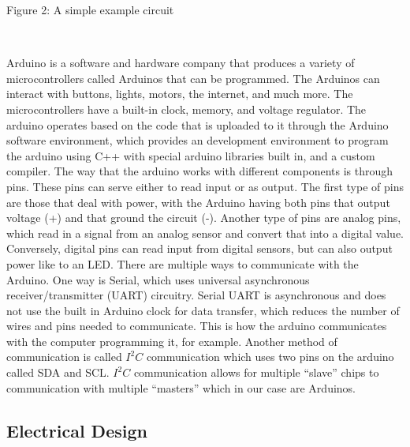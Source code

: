 \documentclass[12pt,]{article}
\begin{document}
Figure 2: A simple example circuit

~

Arduino is a software and hardware company that produces a variety of
microcontrollers called Arduinos that can be programmed. The Arduinos
can interact with buttons, lights, motors, the internet, and much more.
The microcontrollers have a built-in clock, memory, and voltage
regulator. The arduino operates based on the code that is uploaded to it
through the Arduino software environment, which provides an development
environment to program the arduino using C++ with special arduino
libraries built in, and a custom compiler. The way that the arduino
works with different components is through pins. These pins can serve
either to read input or as output. The first type of pins are those that
deal with power, with the Arduino having both pins that output voltage
(+) and that ground the circuit (-). Another type of pins are analog
pins, which read in a signal from an analog sensor and convert that into
a digital value. Conversely, digital pins can read input from digital
sensors, but can also output power like to an LED. There are multiple
ways to communicate with the Arduino. One way is Serial, which uses
universal asynchronous receiver/transmitter (UART) circuitry. Serial
UART is asynchronous and does not use the built in Arduino clock for
data transfer, which reduces the number of wires and pins needed to
communicate. This is how the arduino communicates with the computer
programming it, for example. Another method of communication is called
\(I^2C\) communication which uses two pins on the arduino called SDA and
SCL. \(I^2C\) communication allows for multiple ``slave'' chips to
communication with multiple ``masters'' which in our case are Arduinos.

\subsection{Electrical Design}\label{electrical-design}
\end{document}
